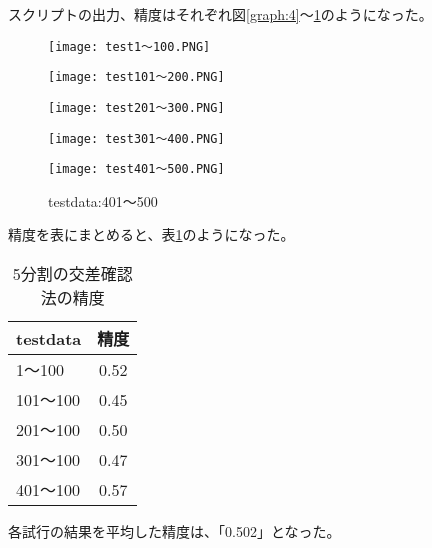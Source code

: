 \begin{itemize}
  \item スクリプトの出力、精度はそれぞれ図\ref{graph:4}～\ref{graph:8}のようになった。
  \begin{figure}[htbp]
    \begin{minipage}[t]{0.33\hsize}
      \centering
      \caption{testdata:1～100}
      \label{graph:4}
      \texttt{[image: test1～100.PNG]}
    \end{minipage}
    \begin{minipage}[t]{0.33\hsize}
      \centering
      \caption{testdata:101～200}
      \label{graph:5}
      \texttt{[image: test101～200.PNG]}
    \end{minipage}
    \begin{minipage}[t]{0.33\hsize}
      \centering
      \caption{testdata:201～300}
      \label{graph:6}
      \texttt{[image: test201～300.PNG]}
    \end{minipage}
    \begin{minipage}[t]{0.45\hsize}
      \centering
      \caption{testdata:301～400}
      \label{graph:7}
      \texttt{[image: test301～400.PNG]}
    \end{minipage}
    \begin{minipage}[t]{0.45\hsize}
      \centering
      \caption{testdata:401～500}
      \label{graph:8}
      \texttt{[image: test401～500.PNG]}
    \end{minipage}
  \end{figure}
  \item 精度を表にまとめると、表\ref{table:20}のようになった。
                            \begin{table}[hbtp]
                              \centering
                              \caption{5分割の交差確認法の精度}
                              \label{table:20}
                                \begin{tabular}{|l|c|}
                                  \hline
                                  testdata  & 精度  \\
                                  \hline
                                  1～100    & 0.52\\
                                  101～100  & 0.45\\
                                  201～100  & 0.50\\
                                  301～100  & 0.47\\
                                  401～100  & 0.57\\
                                  \hline
                                \end{tabular}
                            \end{table}
\LARGE{\item 各試行の結果を平均した精度は、「0.502」となった。}
\end{itemize}
\clearpage

